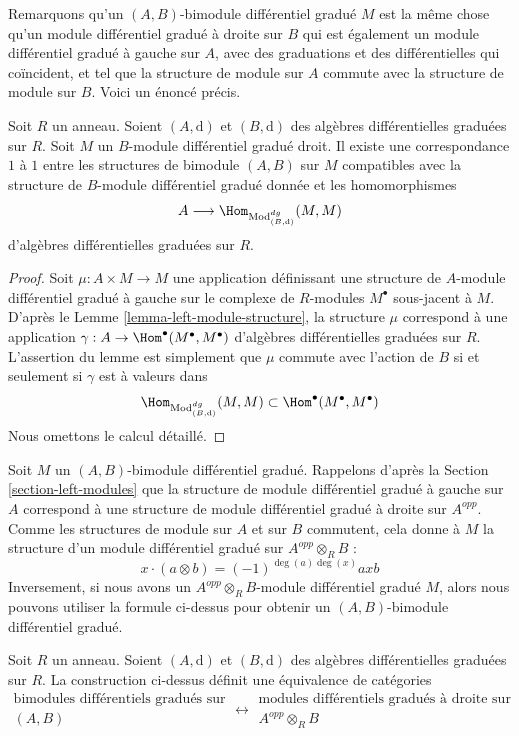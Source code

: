 \noindent
Remarquons qu'un $(A, B)$-bimodule différentiel gradué $M$ est la même chose qu'un
module différentiel gradué à droite sur $B$ qui est également un module différentiel
gradué à gauche sur $A$, avec des graduations et des différentielles
qui coïncident, et tel que la structure de module sur $A$ commute avec la
structure de module sur $B$. Voici un énoncé précis.

\begin{lemma}
\label{lemma-what-makes-a-bimodule-dg}
Soit $R$ un anneau. Soient $(A, \text{d})$ et $(B, \text{d})$ des algèbres
différentielles graduées sur $R$. Soit $M$ un $B$-module différentiel gradué
droit. Il existe une correspondance $1$ à $1$ entre les structures de bimodule
$(A, B)$ sur $M$ compatibles avec la structure de $B$-module différentiel gradué
donnée et les homomorphismes
$$
A
\longrightarrow
\Hom_{\text{Mod}^{dg}_{(B, \text{d})}}(M, M)
$$
d'algèbres différentielles graduées sur $R$.
\end{lemma}

\begin{proof}
Soit $\mu : A \times M \to M$ une application définissant une structure de $A$-module
différentiel gradué à gauche sur le complexe de $R$-modules $M^\bullet$ sous-jacent à
$M$. D'après le Lemme \ref{lemma-left-module-structure}, la structure $\mu$
correspond à une application $\gamma : A \to \Hom^\bullet(M^\bullet, M^\bullet)$
d'algèbres différentielles graduées sur $R$. L'assertion du lemme est simplement que
$\mu$ commute avec l'action de $B$ si et seulement si $\gamma$ est à valeurs dans
$$
\Hom_{\text{Mod}^{dg}_{(B, \text{d})}}(M, M) \subset
\Hom^\bullet(M^\bullet, M^\bullet)
$$
Nous omettons le calcul détaillé.
\end{proof}

\noindent
Soit $M$ un $(A, B)$-bimodule différentiel gradué. Rappelons d'après la Section
\ref{section-left-modules} que la structure de module différentiel gradué à gauche
sur $A$ correspond à une structure de module différentiel gradué à droite sur $A^{opp}$.
Comme les structures de module sur $A$ et sur $B$ commutent, cela donne à $M$ la structure
d'un module différentiel gradué sur $A^{opp} \otimes_R B$ :
$$
x \cdot (a \otimes b) = (-1)^{\deg(a)\deg(x)} axb
$$
Inversement, si nous avons un $A^{opp} \otimes_R B$-module différentiel gradué $M$,
alors nous pouvons utiliser la formule ci-dessus pour obtenir un $(A, B)$-bimodule
différentiel gradué.

\begin{lemma}
\label{lemma-bimodule-over-tensor}
Soit $R$ un anneau. Soient $(A, \text{d})$ et $(B, \text{d})$ des algèbres
différentielles graduées sur $R$. La construction ci-dessus définit une
équivalence de catégories
$$
\begin{matrix}
\text{bimodules différentiels gradués sur}\\
(A, B)\text{}
\end{matrix}
\longleftrightarrow
\begin{matrix}
\text{modules différentiels gradués à droite sur }\\
A^{opp} \otimes_R B\text{}
\end{matrix}
$$
\end{lemma}

